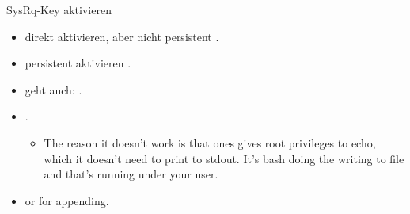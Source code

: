\begin{frame}[fragile]{SysRq-Key aktivieren}
  \begin{itemize}
    \item \alert{direkt aktivieren, aber nicht persistent} {\tiny {}}.
    \item \alert{persistent aktivieren} {\tiny {}.}
  \end{itemize}
  \begin{Sidenote}
    \begin{itemize}
      \scriptsize
      \item \alert{geht auch:} {\tiny {\tiny {}}}.
      \item {\tiny {}}.
      \begin{itemize}
        \item The reason it doesn't work is that ones gives root privileges to echo, which it doesn't need to print to stdout. It's bash doing the writing to file and that's running under your user.
      \end{itemize}
      \item {} or \inlinebox{>>} for appending.
    \end{itemize}
  \end{Sidenote}
\end{frame}

